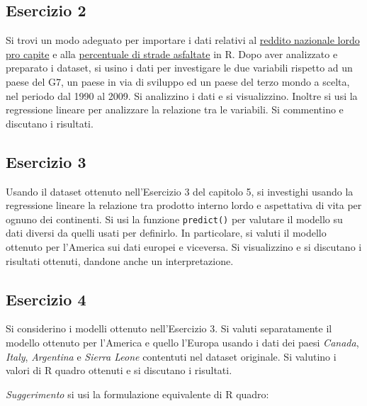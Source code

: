 \documentclass[]{book}
\begin{document}
\hypertarget{esercizio-2-3}{%
\subsection{Esercizio 2}\label{esercizio-2-3}}

Si trovi un modo adeguato per importare i dati relativi al \href{http://docs.google.com/spreadsheet/pub?key=0ArfEDsV3bBwCdGhJcHAwanc2aFdZeXl1WTVZQnJjb1E\&output=xlsx}{reddito nazionale lordo pro capite} e alla \href{http://docs.google.com/spreadsheet/pub?key=0AkBd6lyS3EmpdDBKd2V5VmxkYlJuUHAtOURzUkZzNEE\&output=csv}{percentuale di strade asfaltate} in R. Dopo aver analizzato e preparato i dataset, si usino i dati per investigare le due variabili rispetto ad un paese del G7, un paese in via di sviluppo ed un paese del terzo mondo a scelta, nel periodo dal 1990 al 2009.
Si analizzino i dati e si visualizzino. Inoltre si usi la regressione lineare per analizzare la relazione tra le variabili. Si commentino e discutano i risultati.

\hypertarget{esercizio-3-2}{%
\subsection{Esercizio 3}\label{esercizio-3-2}}

Usando il dataset ottenuto nell'Esercizio 3 del capitolo 5, si investighi usando la regressione lineare la relazione tra prodotto interno lordo e aspettativa di vita per ognuno dei continenti. Si usi la funzione \texttt{predict()} per valutare il modello su dati diversi da quelli usati per definirlo. In particolare, si valuti il modello ottenuto per l'America sui dati europei e viceversa. Si visualizzino e si discutano i risultati ottenuti, dandone anche un interpretazione.

\hypertarget{esercizio-4-2}{%
\subsection{Esercizio 4}\label{esercizio-4-2}}

Si considerino i modelli ottenuto nell'Esercizio 3. Si valuti separatamente il modello ottenuto per l'America e quello l'Europa usando i dati dei paesi \emph{Canada}, \emph{Italy}, \emph{Argentina} e \emph{Sierra Leone} contentuti nel dataset originale. Si valutino i valori di R quadro ottenuti e si discutano i risultati.

\emph{Suggerimento} si usi la formulazione equivalente di R quadro:


\end{document}

